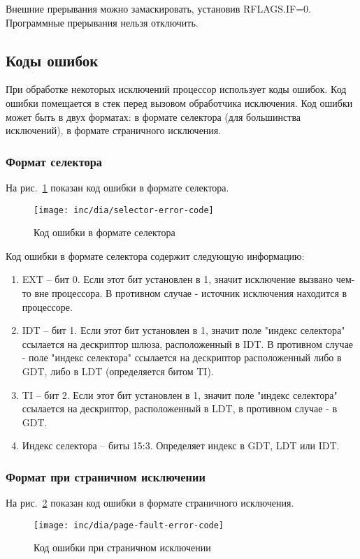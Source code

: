 Внешние прерывания можно замаскировать, установив RFLAGS.IF=0. Программные
прерывания нельзя отключить.

\subsection{Коды ошибок}
При обработке некоторых исключений процессор использует коды ошибок. Код
ошибки помещается в стек перед вызовом обработчика исключения. Код ошибки
может быть в двух форматах: в формате селектора (для большинства исключений),
в формате страничного исключения.

\subsubsection*{Формат селектора}
На рис.~\ref{fig:selector_error_code} показан код ошибки в формате селектора.
\begin{figure}
  \centering
  \texttt{[image: inc/dia/selector-error-code]}
  \caption{Код ошибки в формате селектора}
  \label{fig:selector_error_code}
\end{figure}

Код ошибки в формате селектора содержит следующую информацию:
\begin{enumerate}
\item EXT -- бит 0. Если этот бит установлен в 1, значит исключение вызвано
чем-то вне процессора. В противном случае - источник исключения находится в
процессоре.
\item IDT -- бит 1. Если этот бит установлен в 1, значит поле "индекс
селектора" ссылается на дескриптор шлюза, расположенный в IDT. В
противном случае - поле "индекс селектора" ссылается на дескриптор
расположенный либо в GDT, либо в LDT (определяется битом TI).
\item TI -- бит 2. Если этот бит установлен в 1, значит поле "индекс
селектора" ссылается на дескриптор, расположенный в LDT, в противном случае -
в GDT.
\item Индекс селектора -- биты 15:3. Определяет индекс в GDT, LDT или IDT.
\end{enumerate}

\subsubsection*{Формат при страничном исключении}
На рис.~\ref{fig:page_fault_error_code} показан код ошибки в формате страничного исключения.

\begin{figure}
  \centering
  \texttt{[image: inc/dia/page-fault-error-code]}
  \caption{Код ошибки при страничном исключении}
  \label{fig:page_fault_error_code}
\end{figure}


